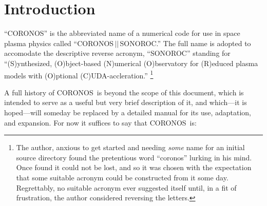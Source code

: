 \documentclass[12pt, letterpaper, oneside, leqno, openright]{memoir}
\newcommand{\coronos}{\textsf{CORONOS}}
\newcommand{\sonoroc}{\textsf{SONOROC}}
\begin{document}
\chapter{Introduction}
\label{sec:intro}
%
%
``\coronos'' is the abbreviated name of a numerical code for use 
in space plasma physics called  ``\coronos$\,||\,$\sonoroc.'' The 
full name is adopted to accomodate the descriptive reverse acronym,
``\sonoroc'' standing for ``(S)ynthesized, (O)bject-based
(N)umerical (O)bservatory for (R)educed \newline plasma models with
(O)ptional (C)UDA-accleration.''
%
\footnote{The author, anxious to 
get started and needing {\em some} name for an initial source
directory found the pretentious word ``coronos'' lurking in his
mind. Once found it could not be lost, and so it was chosen with
the expectation that some suitable acronym could be constructed
from it some day.  Regrettably, no suitable acronym ever suggested
itself until, in a fit of frustration, the author considered
reversing the letters.}
%
\par
%
A full history of \coronos\ is beyond the scope of this document,
which is intended to serve as a useful but very brief description
of it, and which---it is hoped---will someday be replaced by a
detailed manual for its use, adaptation, and expansion. For now it
suffices to say that \coronos\ is:
%
%
\end{document}
